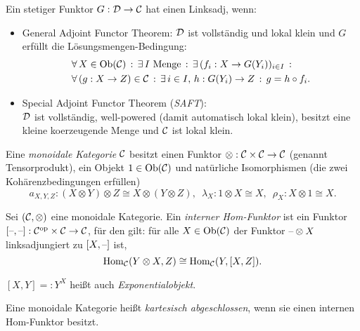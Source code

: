 \documentclass{cheat-sheet}
\begin{document}
\begin{lem}
  Ein stetiger Funktor $G : \mathcal{D} \to \mathcal{C}$ hat einen Linksadj, wenn:
  \begin{itemize}
    \item General Adjoint Functor Theorem: $\mathcal{D}$ ist vollständig und lokal klein und $G$ erfüllt die Lösungsmengen-Bedingung:
    \begin{align*}
      & \forall \, {X \in \operatorname{Ob}(\mathcal{C})} \,:\, \exists \, {I \text{ Menge}} \,:\, \exists \, {(f_i : X \to G(Y_i))_{i \in I}} \,:\, \\
      & \forall \, {(g : X \to Z) \in \mathcal{C}} \,:\, \exists \, {i \in I, \, h : G(Y_i) \to Z} \,:\, g = h \circ f_i.
    \end{align*}
    \item Special Adjoint Functor Theorem (\emph{SAFT}): \\
    $\mathcal{D}$ ist vollständig, well-powered (damit automatisch lokal klein), besitzt eine kleine koerzeugende Menge und $\mathcal{C}$ ist lokal klein.
  \end{itemize}
\end{lem}

\begin{defn}
  Eine \emph{monoidale Kategorie} $\mathcal{C}$ besitzt einen Funktor $\otimes : \mathcal{C} \times \mathcal{C} \to \mathcal{C}$ (genannt Tensorprodukt), ein Objekt $1 \in \operatorname{Ob}(\mathcal{C})$ und natürliche Isomorphismen
  (die zwei Kohärenzbedingungen erfüllen)
  \[
    a_{X,Y,Z} : (X \otimes Y) \otimes Z \cong X \otimes (Y \otimes Z), \enspace
    \lambda_X : 1 \otimes X \cong X, \enspace
    \rho_X : X \otimes 1 \cong X.
  \]
\end{defn}

\begin{defn}
  Sei $(\mathcal{C}, \otimes)$ eine monoidale Kategorie. Ein \emph{interner Hom-Funktor} ist ein Funktor $[\text{--},\text{--}] : \mathcal{C}^{\mathrm{op}} \times \mathcal{C} \to \mathcal{C}$, für den gilt: für alle $X \in \operatorname{Ob}(\mathcal{C})$ der Funktor $\text{--} \otimes X$ linksadjungiert zu $[X, \text{--}]$ ist, \dh{}
  \[ \operatorname{Hom}_{\mathcal{C}}(Y \otimes X, Z) \cong \operatorname{Hom}_{\mathcal{C}}(Y, [X, Z]). \]
\end{defn}

\begin{nota}
  $[X, Y] =: Y^X$ heißt auch \emph{Exponentialobjekt}.
\end{nota}

\begin{defn}
  Eine monoidale Kategorie heißt \emph{kartesisch abgeschlossen}, wenn sie einen internen Hom-Funktor besitzt.
\end{defn}
\end{document}
